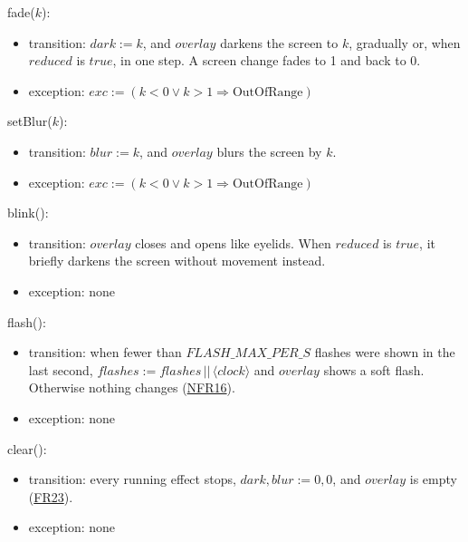 \documentclass[10pt, titlepage]{article}
\newcommand{\srsurl}{https://team-hindsight.github.io/ophthamology-game/SRS/SRS.pdf}
\newcommand{\srsitemref}[2]{\href{\srsurl\#nameddest=#1}{#2}}
\newcommand{\T}[1]{\mathit{#1}}          %
\newcommand{\exc}{\mathit{exc}}
\newcommand{\true}{\mathit{true}}
\begin{document}
\begin{samepage}
\noindent fade($k$):
\begin{itemize}
\item transition: $\T{dark} := k$, and $\T{overlay}$ darkens the screen to
  $k$, gradually or, when $\T{reduced}$ is $\true$, in one step. A screen
  change fades to 1 and back to 0.
\item exception: $\exc := (k < 0 \vee k > 1 \Rightarrow \text{OutOfRange})$
\end{itemize}
\end{samepage}
\par\pagebreak[0]

\begin{samepage}
\noindent setBlur($k$):
\begin{itemize}
\item transition: $\T{blur} := k$, and $\T{overlay}$ blurs the screen by $k$.
\item exception: $\exc := (k < 0 \vee k > 1 \Rightarrow \text{OutOfRange})$
\end{itemize}
\end{samepage}
\par\pagebreak[0]

\begin{samepage}
\noindent blink():
\begin{itemize}
\item transition: $\T{overlay}$ closes and opens like eyelids. When
  $\T{reduced}$ is $\true$, it briefly darkens the screen without movement
  instead.
\item exception: none
\end{itemize}
\end{samepage}
\par\pagebreak[0]

\begin{samepage}
\noindent flash():
\begin{itemize}
\item transition: when fewer than $\T{FLASH\_MAX\_PER\_S}$ flashes were shown
  in the last second, $\T{flashes} := \T{flashes} \,||\, \langle \T{clock}
  \rangle$ and $\T{overlay}$ shows a soft flash. Otherwise nothing changes
  (\srsitemref{NFR_Flashing}{NFR16}).
\item exception: none
\end{itemize}
\end{samepage}
\par\pagebreak[0]

\begin{samepage}
\noindent clear():
\begin{itemize}
\item transition: every running effect stops, $\T{dark}, \T{blur} := 0, 0$,
  and $\T{overlay}$ is empty (\srsitemref{FR_StopOnExit}{FR23}).
\item exception: none
\end{itemize}
\end{samepage}
\par\pagebreak[0]
\end{document}
